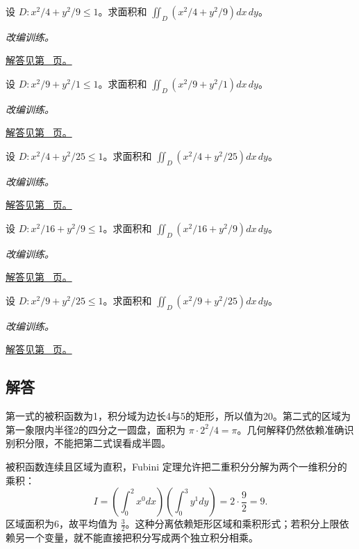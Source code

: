 \documentclass[12pt,fontset=fandol]{ctexart}
\begin{document}
\begin{example}[椭圆换元与面积矩]\label{ex:c36q21}
设 $D:x^2/4+y^2/9\le1$。求面积和 $\displaystyle\iint_D(x^2/4+y^2/9)dx\,dy$。
\par\textit{改编训练。}\par\hyperref[ans:c36q21]{解答见第~\pageref{ans:c36q21} 页。}
\end{example}
\begin{example}[椭圆换元与面积矩]\label{ex:c36q22}
设 $D:x^2/9+y^2/1\le1$。求面积和 $\displaystyle\iint_D(x^2/9+y^2/1)dx\,dy$。
\par\textit{改编训练。}\par\hyperref[ans:c36q22]{解答见第~\pageref{ans:c36q22} 页。}
\end{example}
\begin{example}[椭圆换元与面积矩]\label{ex:c36q23}
设 $D:x^2/4+y^2/25\le1$。求面积和 $\displaystyle\iint_D(x^2/4+y^2/25)dx\,dy$。
\par\textit{改编训练。}\par\hyperref[ans:c36q23]{解答见第~\pageref{ans:c36q23} 页。}
\end{example}
\begin{example}[椭圆换元与面积矩]\label{ex:c36q24}
设 $D:x^2/16+y^2/9\le1$。求面积和 $\displaystyle\iint_D(x^2/16+y^2/9)dx\,dy$。
\par\textit{改编训练。}\par\hyperref[ans:c36q24]{解答见第~\pageref{ans:c36q24} 页。}
\end{example}
\begin{example}[椭圆换元与面积矩]\label{ex:c36q25}
设 $D:x^2/9+y^2/25\le1$。求面积和 $\displaystyle\iint_D(x^2/9+y^2/25)dx\,dy$。
\par\textit{改编训练。}\par\hyperref[ans:c36q25]{解答见第~\pageref{ans:c36q25} 页。}
\end{example}
\subsection{解答}
\begin{solve}\label{ans:c36q1}
第一式的被积函数为1，积分域为边长4与5的矩形，所以值为20。第二式的区域为第一象限内半径2的四分之一圆盘，面积为 $\pi\cdot2^2/4=\pi$。几何解释仍然依赖准确识别积分限，不能把第二式误看成半圆。
\end{solve}

\begin{solve}\label{ans:c36q2}
被积函数连续且区域为直积，Fubini 定理允许把二重积分分解为两个一维积分的乘积：
\[
I=\left(\int_0^2x^{0}dx\right)\left(\int_0^3y^{1}dy\right)=2\cdot\frac{9}{2}=9.
\]
区域面积为6，故平均值为 $\frac{3}{2}$。这种分离依赖矩形区域和乘积形式；若积分上限依赖另一个变量，就不能直接把积分写成两个独立积分相乘。
\end{solve}
\end{document}
